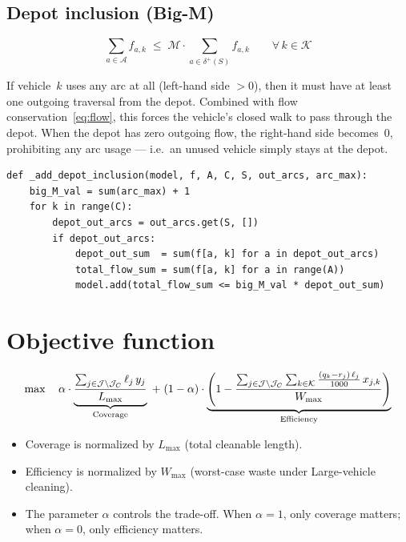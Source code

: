 \documentclass[11pt]{article}
\newcommand{\setA}{\mathcal{A}}   %
\newcommand{\setJ}{\mathcal{J}}   %
\newcommand{\setK}{\mathcal{K}}   %
\newcommand{\Jc}{\mathcal{J}_C}   %
\newcommand{\depot}{S}
\begin{document}
\subsection{Depot inclusion (Big-M)}

\begin{equation}\label{eq:depot}
\sum_{a \in \setA} f_{a,k}
\;\le\;
\mathcal{M} \cdot \sum_{a \in \delta^+(\depot)} f_{a,k}
\qquad \forall\, k \in \setK
\end{equation}

If vehicle~$k$ uses any arc at all (left-hand side $> 0$), then it must
have at least one outgoing traversal from the depot.  Combined with flow
conservation~\eqref{eq:flow}, this forces the vehicle's closed walk to
pass through the depot.  When the depot has zero outgoing flow, the
right-hand side becomes~$0$, prohibiting any arc usage --- i.e.\ an
unused vehicle simply stays at the depot.

\begin{lstlisting}[caption={Constraint~(\ref{eq:depot}): Depot inclusion (Big-M)}]
def _add_depot_inclusion(model, f, A, C, S, out_arcs, arc_max):
    big_M_val = sum(arc_max) + 1
    for k in range(C):
        depot_out_arcs = out_arcs.get(S, [])
        if depot_out_arcs:
            depot_out_sum  = sum(f[a, k] for a in depot_out_arcs)
            total_flow_sum = sum(f[a, k] for a in range(A))
            model.add(total_flow_sum <= big_M_val * depot_out_sum)
\end{lstlisting}

\section{Objective function}

\begin{equation}\label{eq:obj}
\max \quad
\alpha \cdot
\underbrace{%
    \frac{\sum_{j \in \setJ \setminus \Jc} \ell_j \, y_j}{L_{\max}}
}_{\text{Coverage}}
\;+\;
(1-\alpha) \cdot
\underbrace{%
    \left(
    1 -
    \frac{\sum_{j \in \setJ \setminus \Jc}
    \sum_{k \in \setK}
    \frac{(q_k - r_j) \, \ell_j}{1000}
    \, x_{j,k}}{W_{\max}}
    \right)
}_{\text{Efficiency}}
\end{equation}

\begin{itemize}[nosep]
  \item Coverage is normalized by $L_{\max}$ (total cleanable length).
  \item Efficiency is normalized by $W_{\max}$ (worst-case waste under Large-vehicle cleaning).
  \item The parameter $\alpha$ controls the trade-off. When $\alpha=1$, only
        coverage matters; when $\alpha=0$, only efficiency matters.
\end{itemize}
\end{document}
